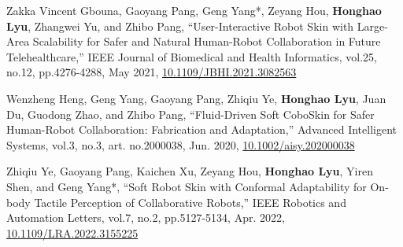 \begin{enumerate}[align=left, widest={[\textbf{S.1}]}, itemindent=0em, label={\textbf{[\arabic*]}]
    \item[\textbf{[J.3]}] Zakka Vincent Gbouna\dag, Gaoyang Pang\dag, Geng Yang*, Zeyang Hou, \textbf{Honghao Lyu}, Zhangwei Yu, and Zhibo Pang, ``User-Interactive Robot Skin with Large-Area Scalability for Safer and Natural Human-Robot Collaboration in Future Telehealthcare,'' IEEE Journal of Biomedical and Health Informatics, vol.25, no.12, pp.4276-4288, May 2021, \href{https://doi.org/10.1109/JBHI.2021.3082563}{10.1109/JBHI.2021.3082563}
    \item[\textbf{[J.2]}] Wenzheng Heng, Geng Yang, Gaoyang Pang, Zhiqiu Ye, \textbf{Honghao Lyu}, Juan Du, Guodong Zhao, and Zhibo Pang, ``Fluid-Driven Soft CoboSkin for Safer Human-Robot Collaboration: Fabrication and Adaptation,'' Advanced Intelligent Systems, vol.3, no.3, art. no.2000038, Jun. 2020, \href{https://doi.org/10.1002/aisy.202000038}{10.1002/aisy.202000038}
    \item[\textbf{[J.1]}] Zhiqiu Ye\dag, Gaoyang Pang\dag, Kaichen Xu, Zeyang Hou, \textbf{Honghao Lyu}, Yiren Shen, and Geng Yang*, ``Soft Robot Skin with Conformal Adaptability for On-body Tactile Perception of Collaborative Robots,'' IEEE Robotics and Automation Letters, vol.7, no.2, pp.5127-5134, Apr. 2022, \href{https://doi.org/10.1109/LRA.2022.3155225}{10.1109/LRA.2022.3155225}
\end{enumerate}
\resumeItemListEnd

